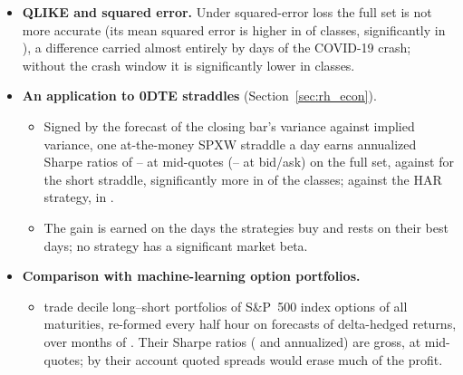 \begin{itemize}
\begin{itemize}
  \item Under our causal construction the StockTwits and volatility-demand series are live on
    \rhlvStSentEvLo--\rhlvStAttEvHi\% and \rhlvVdEvLo--\rhlvVdEvHi\% of the scored bars; on those bars they change the
    loss little, and volatility demand raises that of the linear models.
  \item Their share of the trees' attribution rises in their live years (StockTwits
    \rhfilStwLiveMin--\rhfilStwLiveMax\%, from at most \rhfilStwWinPct\% of the training window), but use is not
    accuracy.
  \end{itemize}
\item \textbf{QLIKE and squared error.} Under squared-error loss the full set is not more accurate (its mean squared
  error is higher in \rhcaNMseHigherBarSpan{} of \rhorAfPairs{} classes, significantly in \rhcaNMseHigherSigBarSpan),
  a difference carried almost entirely by \rhcaTopDays{} days of the COVID-19 crash; without the crash window it is
  significantly lower in \rhcaNMseLowerSigBarOosExCrash{} classes.
\item \textbf{An application to 0DTE straddles} (Section~\ref{sec:rh_econ}).
  \begin{itemize}
  \item Signed by the forecast of the closing bar's variance against implied variance, one at-the-money SPXW
    straddle a day earns annualized Sharpe ratios of \rhrPoolShFullMin--\rhrPoolShFullMax{} at mid-quotes
    (\rhrPoolShXFullMin--\rhrPoolShXFullMax{} at bid/ask) on the full set, against \rheShortSh{} for the short
    straddle, significantly more in \rhemFullVsShortSig{} of the \rhorAfPairs{} classes; against the HAR strategy, in
    \rhemFullVsOlsHarSig{}.
  \item The gain is earned on the days the strategies buy and rests on their \rhedNTop{} best days; no strategy has a
    significant market beta.
  \end{itemize}
\item \textbf{Comparison with machine-learning option portfolios.}
  \begin{itemize}
  \item \citet{MaischZhangUlrichZimmer2026} trade decile long--short portfolios of S\&P~500 index options of all
    maturities, re-formed every half hour on forecasts of delta-hedged returns, over \extMaischTestMonths{} months of
    \extMaischYear. Their Sharpe ratios (\extMaischSrGbrtAnn{} and \extMaischSrEnsAnn{} annualized) are gross, at
    mid-quotes; by their account quoted spreads would erase much of the profit.

\end{itemize}
\end{itemize}
